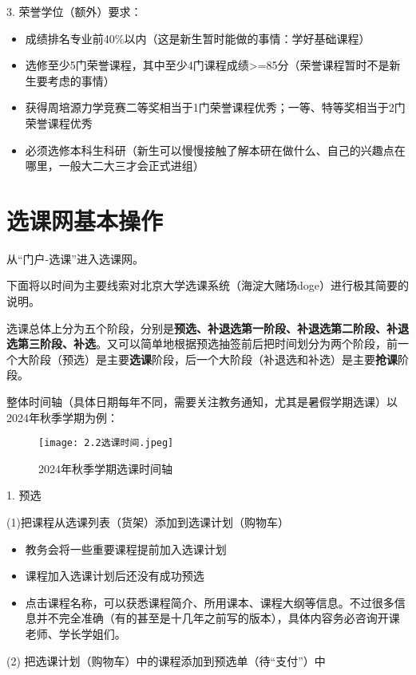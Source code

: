 \documentclass[11pt,oneside]{book}
\begin{document}
3. 荣誉学位（额外）要求：

\begin{itemize}
    \item 成绩排名专业前40\%以内（这是新生暂时能做的事情：学好基础课程）
    \item 选修至少5门荣誉课程，其中至少4门课程成绩>=85分（荣誉课程暂时不是新生要考虑的事情）
    \item 获得周培源力学竞赛二等奖相当于1门荣誉课程优秀；一等、特等奖相当于2门荣誉课程优秀
    \item 必须选修本科生科研（新生可以慢慢接触了解本研在做什么、自己的兴趣点在哪里，一般大二大三才会正式进组）
\end{itemize}

\newpage

\section{选课网基本操作}
从“门户-选课”进入选课网。

下面将以时间为主要线索对北京大学选课系统（海淀大赌场doge）进行极其简要的说明。

选课总体上分为五个阶段，分别是\textbf{\textbf{预选、补退选第一阶段、补退选第二阶段、补退选第三阶段、补选}}。又可以简单地根据预选抽签前后把时间划分为两个阶段，前一个大阶段（预选）是主要\textbf{\textbf{选课}}阶段，后一个大阶段（补退选和补选）是主要\textbf{\textbf{抢课}}阶段。

整体时间轴（具体日期每年不同，需要关注教务通知，尤其是暑假学期选课）以2024年秋季学期为例：
\begin{figure}[htbp]
    \centering
    \texttt{[image: 2.2选课时间.jpeg]}
    \renewcommand{\figurename}{图}
    \caption{2024年秋季学期选课时间轴}
    \label{fig:enter-label}
\end{figure}

1. 预选

(1)把课程从选课列表（货架）添加到选课计划（购物车）

\begin{itemize}
    \item  教务会将一些重要课程提前加入选课计划
    \item 课程加入选课计划后还没有成功预选
    \item 点击课程名称，可以获悉课程简介、所用课本、课程大纲等信息。不过很多信息并不完全准确（有的甚至是十几年之前写的版本），具体内容务必咨询开课老师、学长学姐们。
\end{itemize}

(2) 把选课计划（购物车）中的课程添加到预选单（待“支付”）中
\end{document}
